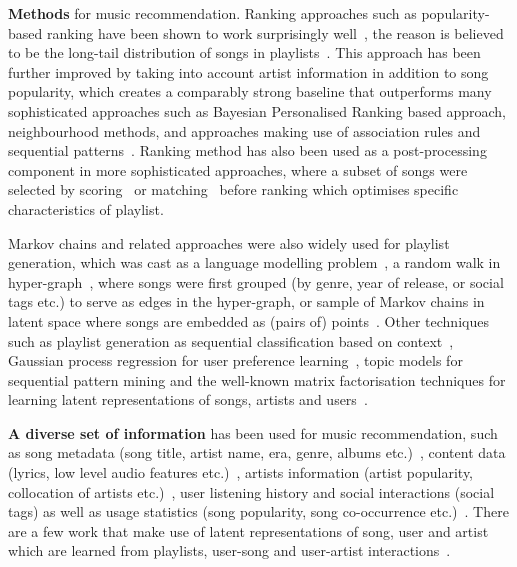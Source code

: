 {\bf Methods} for music recommendation.
Ranking approaches such as popularity-based ranking have been shown to
work surprisingly well~\cite{mcfee2012million,bonnin2013evaluating},
the reason is believed to be the long-tail distribution of songs in 
playlists~\cite{cremonesi2010performance,bonnin2013evaluating}.
%
This approach has been further improved by taking into account artist information in addition to
song popularity, which creates a comparably strong baseline that outperforms many sophisticated 
approaches such as Bayesian Personalised Ranking based approach, neighbourhood methods, and approaches 
making use of association rules and sequential patterns~\cite{mcfee2012million,bonnin2013evaluating}.
%
Ranking method has also been used as a post-processing component in more sophisticated approaches,
where a subset of songs were selected by scoring~\cite{jannach2015beyond} or matching~\cite{hariri2012context}
before ranking which optimises specific characteristics of playlist.


Markov chains and related approaches were also widely used for playlist generation,
which was cast as a language modelling problem~\cite{mcfee2011natural},
a random walk in hyper-graph~\cite{mcfee2012hypergraph}, where songs were first grouped (by genre, 
year of release, or social tags etc.) to serve as edges in the hyper-graph, or sample of Markov chains 
in latent space where songs are embedded as (pairs of) points~\cite{chen2012playlist}.
%
Other techniques such as playlist generation as sequential classification based on context~\cite{ben2017groove},
Gaussian process regression for user preference learning~\cite{platt2002learning},
topic models for sequential pattern mining and the well-known matrix factorisation techniques for learning 
latent representations of songs, artists and users~\cite{mcfee2012hypergraph,chen2012playlist,ben2017groove}.


{\bf A diverse set of information} has been used for music recommendation,
such as song metadata (\eg song title, artist name, era, genre, albums etc.)~\cite{hariri2012context,platt2002learning},
content data (\eg lyrics, low level audio features etc.)~\cite{mcfee2011natural,mcfee2012hypergraph,jannach2015beyond,ben2017groove},
artists information (\eg artist popularity, collocation of artists etc.)~\cite{bonnin2013evaluating,ben2017groove},
user listening history and social interactions (\eg social tags) as well as usage statistics (\eg song popularity, 
song co-occurrence etc.)~\cite{mcfee2012hypergraph,hariri2012context,bonnin2013evaluating,jannach2015beyond,ben2017groove}.
There are a few work that make use of latent representations of song, user and artist which are learned from playlists, 
user-song and user-artist interactions~\cite{chen2012playlist,ben2017groove}.

